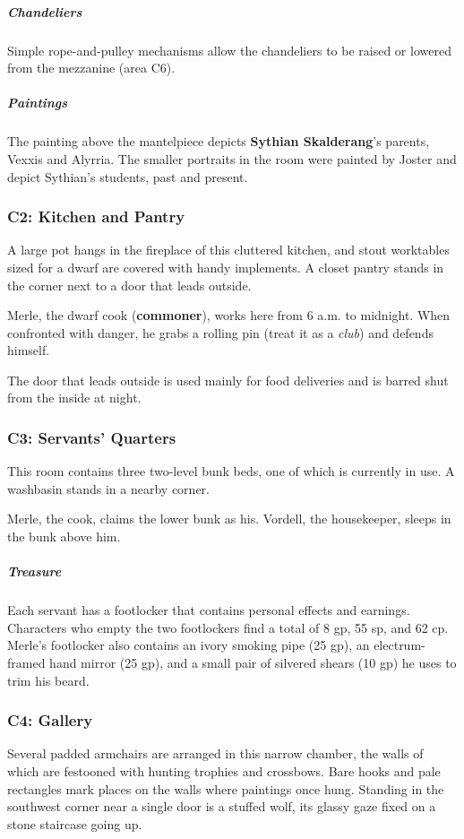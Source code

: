 \documentclass[10pt,a4paper,twoside,bg=print,twocolumn,openany,nodeprecatedcode]{dndbook}
\begin{document}
\subparagraph{Chandeliers}
Simple rope-and-pulley mechanisms allow the chandeliers to be raised or lowered from the mezzanine (area C6).

\subparagraph{Paintings}
The painting above the mantelpiece depicts \textbf{Sythian Skalderang}'s parents, Vexxis and Alyrria. The smaller portraits in the room were painted by Joster and depict Sythian's students, past and present.

\subsubsection{C2: Kitchen and Pantry}
\begin{DndReadAloud}{}
A large pot hangs in the fireplace of this cluttered kitchen, and stout worktables sized for a dwarf are covered with handy implements. A closet pantry stands in the corner next to a door that leads outside.

\end{DndReadAloud}

Merle, the dwarf cook (\textbf{commoner}), works here from 6 a.m. to midnight. When confronted with danger, he grabs a rolling pin (treat it as a \textit{club}) and defends himself.

The door that leads outside is used mainly for food deliveries and is barred shut from the inside at night.

\subsubsection{C3: Servants' Quarters}
\begin{DndReadAloud}{}
This room contains three two-level bunk beds, one of which is currently in use. A washbasin stands in a nearby corner.

\end{DndReadAloud}

Merle, the cook, claims the lower bunk as his. Vordell, the housekeeper, sleeps in the bunk above him.

\subparagraph{Treasure}
Each servant has a footlocker that contains personal effects and earnings. Characters who empty the two footlockers find a total of 8 gp, 55 sp, and 62 cp. Merle's footlocker also contains an ivory smoking pipe (25 gp), an electrum-framed hand mirror (25 gp), and a small pair of silvered shears (10 gp) he uses to trim his beard.

\subsubsection{C4: Gallery}
\begin{DndReadAloud}{}
Several padded armchairs are arranged in this narrow chamber, the walls of which are festooned with hunting trophies and crossbows. Bare hooks and pale rectangles mark places on the walls where paintings once hung. Standing in the southwest corner near a single door is a stuffed wolf, its glassy gaze fixed on a stone staircase going up.

\end{DndReadAloud}
\end{document}
